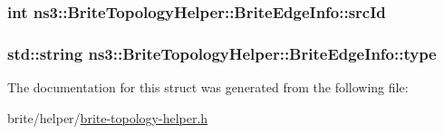 \subsubsection[{\texorpdfstring{src\+Id}{srcId}}]{\setlength{\rightskip}{0pt plus 5cm}int ns3\+::\+Brite\+Topology\+Helper\+::\+Brite\+Edge\+Info\+::src\+Id}\hypertarget{structns3_1_1BriteTopologyHelper_1_1BriteEdgeInfo_a7ce9b61320a3b6118e4feb7789d04f38}{}\label{structns3_1_1BriteTopologyHelper_1_1BriteEdgeInfo_a7ce9b61320a3b6118e4feb7789d04f38}
\subsubsection[{\texorpdfstring{type}{type}}]{\setlength{\rightskip}{0pt plus 5cm}std\+::string ns3\+::\+Brite\+Topology\+Helper\+::\+Brite\+Edge\+Info\+::type}\hypertarget{structns3_1_1BriteTopologyHelper_1_1BriteEdgeInfo_a6e79272701be217cc51d544c0e5aa82c}{}\label{structns3_1_1BriteTopologyHelper_1_1BriteEdgeInfo_a6e79272701be217cc51d544c0e5aa82c}


The documentation for this struct was generated from the following file\+:\begin{DoxyCompactItemize}
\item 
brite/helper/\hyperlink{brite-topology-helper_8h}{brite-\/topology-\/helper.\+h}\end{DoxyCompactItemize}

